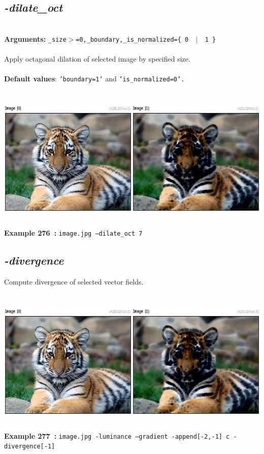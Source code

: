 \documentclass[a4paper,11pt,twoside]{book}
\begin{document}
\subsection{\emph{-dilate\_oct} }\vspace*{-0.5em}
~\\\textbf{Arguments: } 
{\small \texttt{\_size$>$=0,\_boundary,\_is\_normalized=\{ 0 ~$|$~ 1 \}}}\\~\\
Apply octagonal dilation of selected image by specified size.
~\\~\\\textbf{Default values}: {\small \texttt{'boundary=1'} and \texttt{'is\_normalized=0'.}}
\begin{center}\includegraphics[keepaspectratio=true,height=7cm,width=\textwidth]{img/gmic_def276.jpg}\\
{\footnotesize \textbf{Example 276~:} \texttt{image.jpg --dilate\_oct 7}}
\end{center}

\subsection{\emph{-divergence} }\vspace*{-0.5em}
Compute divergence of selected vector fields.
\begin{center}\includegraphics[keepaspectratio=true,height=7cm,width=\textwidth]{img/gmic_def277.jpg}\\
{\footnotesize \textbf{Example 277~:} \texttt{image.jpg -luminance --gradient -append[-2,-1] c -divergence[-1]}}
\end{center}
\end{document}
